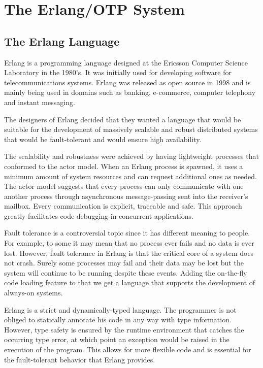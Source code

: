 \chapter{The Erlang/OTP System}\label{ch:erlang_otp_system}

\section{The Erlang Language}\label{sec:erlang_lang}

Erlang is a programming language designed at the Ericsson Computer Science
Laboratory in the 1980’s. It was initially used for developing software for
telecommunications systems. Erlang was released as open source in 1998 and is
mainly being used in domains such as banking, e-commerce, computer telephony
and instant messaging.

The designers of Erlang decided that they wanted a language that would be
suitable for the development of massively scalable and robust distributed
systems that would be fault-tolerant and would ensure high availability.

The scalability and robustness were achieved by having lightweight processes
that conformed to the actor model. When an Erlang process is spawned, it uses a
minimum amount of system resources and can request additional ones as needed.
The actor model suggests that every process can only communicate with one
another process through asynchronous message-passing sent into the receiver’s
mailbox. Every communication is explicit, traceable and safe. This approach
greatly facilitates code debugging in concurrent applications.

Fault tolerance is a controversial topic since it has different meaning to
people. For example, to some it may mean that no process ever fails and no data
is ever lost. However, fault tolerance in Erlang is that the critical core of a
system does not crash. Surely some processes may fail and their data may be
lost but the system will continue to be running despite these events. Adding
the on-the-fly code loading feature to that we get a language that supports the
development of always-on systems.

Erlang is a strict and dynamically-typed language. The programmer is not
obliged to statically annotate his code in any way with type information.
However, type safety is ensured by the runtime environment that catches the
occurring type error, at which point an exception would be raised in the
execution of the program. This allows for more flexible code and is essential
for the fault-tolerant behavior that Erlang provides.


